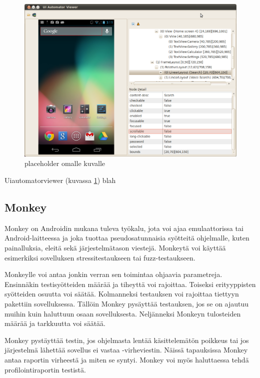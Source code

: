 \begin{figure}[htb]
\includegraphics[width=150mm]{uiautomatorviewer.png}
\caption{placeholder omalle kuvalle} \label{uiautomatorviewer}
\end{figure}

Uiautomatorviewer (kuvassa \ref{uiautomatorviewer}) blah

\cite{android}

\subsection{Monkey}

Monkey on Androidin mukana tuleva työkalu, jota voi ajaa emulaattorissa tai Android-laitteessa ja joka tuottaa pseudosatunnaisia syötteitä ohjelmalle, kuten painalluksia, eleitä sekä järjestelmätason viestejä. Monkeytä voi käyttää esimerkiksi sovelluksen stressitestaukseen tai fuzz-testaukseen.

Monkeylle voi antaa jonkin verran sen toimintaa ohjaavia parametreja. Ensinnäkin testisyötteiden määrää ja tiheyttä voi rajoittaa. Toiseksi erityyppisten syötteiden osuutta voi säätää. Kolmanneksi testauksen voi rajoittaa tiettyyn pakettiin sovelluksessa. Tällöin Monkey pysäyttää testauksen, jos se on ajautuu muihin kuin haluttuun osaan sovelluksesta. Neljänneksi Monkeyn tulosteiden määrää ja tarkkuutta voi säätää.

Monkey pystäyttää testin, jos ohjelmasta lentää käsittelemätön poikkeus tai jos järjestelmä lähettää sovellus ei vastaa -virheviestin. Näissä tapauksissa Monkey antaa raportin virheestä ja miten se syntyi. Monkey voi myös haluttaessa tehdä profilointiraportin testistä.\cite{android}

